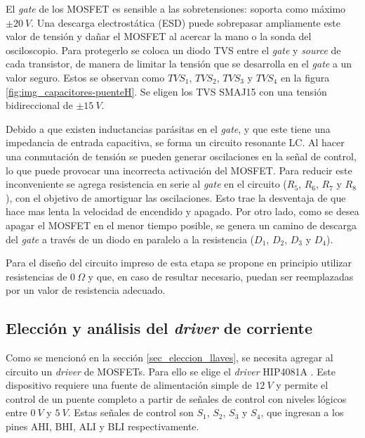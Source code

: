 \noindent El \textsl{gate} de los MOSFET es sensible a las sobretensiones: soporta como máximo $\pm 20\:V$. Una descarga electrostática (ESD) puede sobrepasar ampliamente este valor de tensión y dañar el MOSFET al acercar la mano o la sonda del osciloscopio. Para protegerlo se coloca un diodo TVS entre el \textsl{gate} y \textsl{source} de cada transistor, de manera de limitar la tensión que se desarrolla en el \textsl{gate} a un valor seguro. Estos se observan como $TVS_1$, $TVS_2$, $TVS_3$ y $TVS_4$ en la figura \ref{fig:img_capacitores-puenteH}. Se eligen los TVS SMAJ15 \cite{SMAJ15} con una tensión bidireccional de $\pm 15\:V$.


Debido a que existen inductancias parásitas en el \textsl{gate}, y que este tiene una impedancia de entrada capacitiva, se forma un circuito resonante LC. Al hacer una conmutación de tensión se pueden generar oscilaciones en la señal de control, lo que puede provocar una incorrecta activación del MOSFET. Para reducir este inconveniente se agrega resistencia en serie al \textsl{gate} en el circuito ($R_5$, $R_6$, $R_7$ y $R_8$), con el objetivo de amortiguar las oscilaciones. Esto trae la desventaja de que hace mas lenta la velocidad de encendido y apagado. Por otro lado, como se desea apagar el MOSFET en el menor tiempo posible, se genera un camino de descarga del \textsl{gate} a través de un diodo en paralelo a la resistencia ($D_1$, $D_2$, $D_3$ y $D_4$).

Para el diseño del circuito impreso de esta etapa se propone en principio utilizar resistencias de $0\:\Omega$ y que, en caso de resultar necesario, puedan ser reemplazadas por un valor de resistencia adecuado. 

\subsection{Elección y análisis del \textsl{driver} de corriente}

Como se mencionó en la sección \ref{sec_eleccion_llaves}, se necesita agregar al circuito un \textsl{driver} de MOSFETs. Para ello se elige el \textsl{driver} HIP4081A \cite{HIP4081A_FN3659}. Este dispositivo requiere una fuente de alimentación simple de $12\:V$ y permite el control de un puente completo a partir de señales de control con niveles lógicos entre $0\:V$ y $5\:V$.  Estas señales de control  son $S_1$, $S_2$, $S_3$ y $S_4$, que ingresan  a los pines AHI, BHI, ALI y BLI respectivamente.

